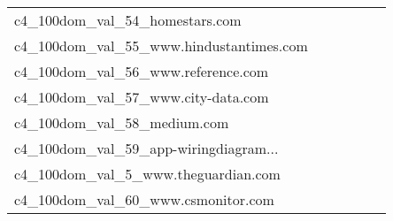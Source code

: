 {\begin{longtable}{m{6cm}m{1.7cm}m{1.7cm}m{1.7cm}m{1.7cm}m{1.7cm}}
	c4\_100dom\_val\_54\_homestars.com  & \colorbox[HTML]{fefee3}{\makebox[\mywidth][c]{14.13}} & \colorbox[HTML]{e9f6af}{\makebox[\mywidth][c]{13.70}} & \colorbox[HTML]{ffffe5}{\makebox[\mywidth][c]{14.51}} & \colorbox[HTML]{d9f0a3}{\makebox[\mywidth][c]{13.65}} & \colorbox[HTML]{77c578}{\makebox[\mywidth][c]{13.52}}\\
	c4\_100dom\_val\_55\_www.hindustantimes.com  & \colorbox[HTML]{fefee2}{\makebox[\mywidth][c]{12.13}} & \colorbox[HTML]{e5f5ac}{\makebox[\mywidth][c]{11.60}} & \colorbox[HTML]{ffffe5}{\makebox[\mywidth][c]{12.74}} & \colorbox[HTML]{e5f5ac}{\makebox[\mywidth][c]{11.60}} & \colorbox[HTML]{77c578}{\makebox[\mywidth][c]{11.37}}\\
	c4\_100dom\_val\_56\_www.reference.com  & \colorbox[HTML]{ffffe5}{\makebox[\mywidth][c]{11.57}} & \colorbox[HTML]{f8fcbf}{\makebox[\mywidth][c]{11.04}} & \colorbox[HTML]{ffffe5}{\makebox[\mywidth][c]{11.75}} & \colorbox[HTML]{dcf1a5}{\makebox[\mywidth][c]{10.92}} & \colorbox[HTML]{77c578}{\makebox[\mywidth][c]{10.79}}\\
	c4\_100dom\_val\_57\_www.city-data.com  & \colorbox[HTML]{fcfdd5}{\makebox[\mywidth][c]{18.38}} & \colorbox[HTML]{e4f4ab}{\makebox[\mywidth][c]{17.94}} & \colorbox[HTML]{ffffe5}{\makebox[\mywidth][c]{19.61}} & \colorbox[HTML]{addd8e}{\makebox[\mywidth][c]{17.73}} & \colorbox[HTML]{77c578}{\makebox[\mywidth][c]{17.62}}\\
	c4\_100dom\_val\_58\_medium.com  & \colorbox[HTML]{fafdca}{\makebox[\mywidth][c]{15.50}} & \colorbox[HTML]{a9db8c}{\makebox[\mywidth][c]{15.09}} & \colorbox[HTML]{ffffe5}{\makebox[\mywidth][c]{16.58}} & \colorbox[HTML]{cdeb9d}{\makebox[\mywidth][c]{15.18}} & \colorbox[HTML]{77c578}{\makebox[\mywidth][c]{15.01}}\\
	c4\_100dom\_val\_59\_app-wiringdiagram...  & \colorbox[HTML]{ffffe5}{\makebox[\mywidth][c]{9.74}} & \colorbox[HTML]{fbfdd0}{\makebox[\mywidth][c]{9.10}} & \colorbox[HTML]{ffffe5}{\makebox[\mywidth][c]{9.68}} & \colorbox[HTML]{d8efa2}{\makebox[\mywidth][c]{8.88}} & \colorbox[HTML]{77c578}{\makebox[\mywidth][c]{8.75}}\\
	c4\_100dom\_val\_5\_www.theguardian.com  & \colorbox[HTML]{fefee3}{\makebox[\mywidth][c]{14.78}} & \colorbox[HTML]{ddf1a6}{\makebox[\mywidth][c]{14.09}} & \colorbox[HTML]{ffffe5}{\makebox[\mywidth][c]{15.47}} & \colorbox[HTML]{dcf1a5}{\makebox[\mywidth][c]{14.08}} & \colorbox[HTML]{77c578}{\makebox[\mywidth][c]{13.86}}\\
	c4\_100dom\_val\_60\_www.csmonitor.com  & \colorbox[HTML]{fefee3}{\makebox[\mywidth][c]{15.35}} & \colorbox[HTML]{eff8b3}{\makebox[\mywidth][c]{14.85}} & \colorbox[HTML]{ffffe5}{\makebox[\mywidth][c]{15.92}} & \colorbox[HTML]{daf0a4}{\makebox[\mywidth][c]{14.75}} & \colorbox[HTML]{77c578}{\makebox[\mywidth][c]{14.57}}\\

\end{longtable}}

